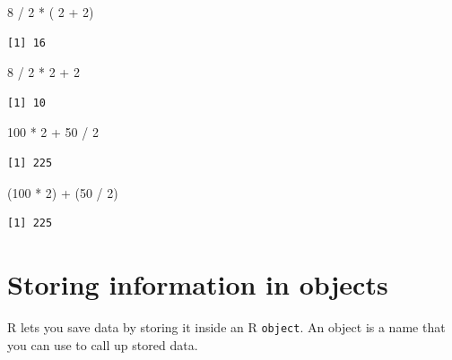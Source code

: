 \documentclass[
  letterpaper,
  DIV=11,
  numbers=noendperiod]{scrreprt}
\newenvironment{Shaded}{\begin{snugshade}}{\end{snugshade}}
\newcommand{\DecValTok}[1]{\textcolor[rgb]{0.68,0.00,0.00}{#1}}
\newcommand{\NormalTok}[1]{\textcolor[rgb]{0.00,0.23,0.31}{#1}}
\newcommand{\SpecialCharTok}[1]{\textcolor[rgb]{0.37,0.37,0.37}{#1}}
\begin{document}
\begin{Shaded}
\begin{Highlighting}[]
\DecValTok{8} \SpecialCharTok{/} \DecValTok{2} \SpecialCharTok{*}\NormalTok{ ( }\DecValTok{2} \SpecialCharTok{+} \DecValTok{2}\NormalTok{)}
\end{Highlighting}
\end{Shaded}

\begin{verbatim}
[1] 16
\end{verbatim}

\begin{Shaded}
\begin{Highlighting}[]
\DecValTok{8} \SpecialCharTok{/} \DecValTok{2} \SpecialCharTok{*} \DecValTok{2} \SpecialCharTok{+} \DecValTok{2}
\end{Highlighting}
\end{Shaded}

\begin{verbatim}
[1] 10
\end{verbatim}

\begin{Shaded}
\begin{Highlighting}[]
\DecValTok{100} \SpecialCharTok{*} \DecValTok{2} \SpecialCharTok{+} \DecValTok{50} \SpecialCharTok{/} \DecValTok{2}
\end{Highlighting}
\end{Shaded}

\begin{verbatim}
[1] 225
\end{verbatim}

\begin{Shaded}
\begin{Highlighting}[]
\NormalTok{(}\DecValTok{100} \SpecialCharTok{*} \DecValTok{2}\NormalTok{) }\SpecialCharTok{+}\NormalTok{ (}\DecValTok{50} \SpecialCharTok{/} \DecValTok{2}\NormalTok{)}
\end{Highlighting}
\end{Shaded}

\begin{verbatim}
[1] 225
\end{verbatim}

\section{Storing information in
objects}\label{storing-information-in-objects}

R lets you save data by storing it inside an R \texttt{object}. An
object is a name that you can use to call up stored data.
\end{document}
